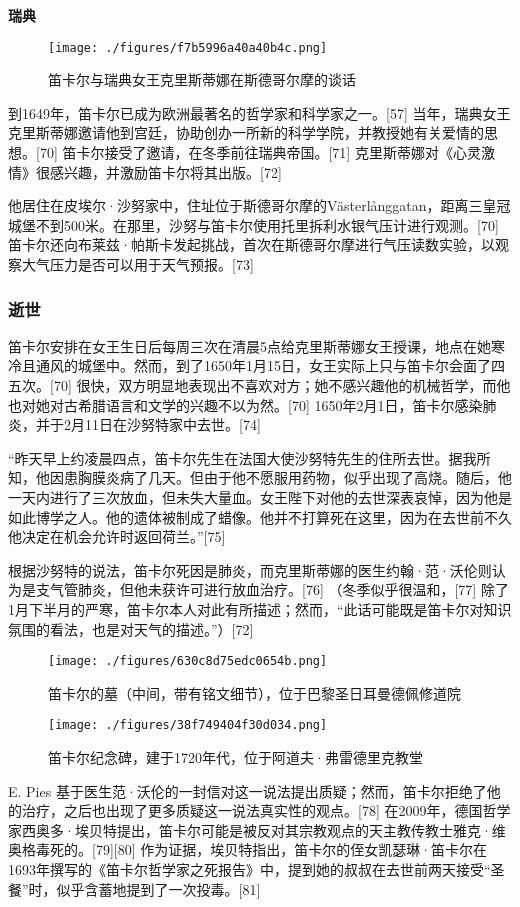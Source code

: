 \textbf{瑞典}
\begin{figure}[ht]
\centering
\texttt{[image: ./figures/f7b5996a40a40b4c.png]}
\caption{笛卡尔与瑞典女王克里斯蒂娜在斯德哥尔摩的谈话} \label{fig_DKE_6}
\end{figure}
到1649年，笛卡尔已成为欧洲最著名的哲学家和科学家之一。[57] 当年，瑞典女王克里斯蒂娜邀请他到宫廷，协助创办一所新的科学学院，并教授她有关爱情的思想。[70] 笛卡尔接受了邀请，在冬季前往瑞典帝国。[71] 克里斯蒂娜对《心灵激情》很感兴趣，并激励笛卡尔将其出版。[72]

他居住在皮埃尔·沙努家中，住址位于斯德哥尔摩的Västerlånggatan，距离三皇冠城堡不到500米。在那里，沙努与笛卡尔使用托里拆利水银气压计进行观测。[70] 笛卡尔还向布莱兹·帕斯卡发起挑战，首次在斯德哥尔摩进行气压读数实验，以观察大气压力是否可以用于天气预报。[73]
\subsubsection{逝世}
笛卡尔安排在女王生日后每周三次在清晨5点给克里斯蒂娜女王授课，地点在她寒冷且通风的城堡中。然而，到了1650年1月15日，女王实际上只与笛卡尔会面了四五次。[70] 很快，双方明显地表现出不喜欢对方；她不感兴趣他的机械哲学，而他也对她对古希腊语言和文学的兴趣不以为然。[70] 1650年2月1日，笛卡尔感染肺炎，并于2月11日在沙努特家中去世。[74]

“昨天早上约凌晨四点，笛卡尔先生在法国大使沙努特先生的住所去世。据我所知，他因患胸膜炎病了几天。但由于他不愿服用药物，似乎出现了高烧。随后，他一天内进行了三次放血，但未失大量血。女王陛下对他的去世深表哀悼，因为他是如此博学之人。他的遗体被制成了蜡像。他并不打算死在这里，因为在去世前不久他决定在机会允许时返回荷兰。”[75]

根据沙努特的说法，笛卡尔死因是肺炎，而克里斯蒂娜的医生约翰·范·沃伦则认为是支气管肺炎，但他未获许可进行放血治疗。[76] （冬季似乎很温和，[77] 除了1月下半月的严寒，笛卡尔本人对此有所描述；然而，“此话可能既是笛卡尔对知识氛围的看法，也是对天气的描述。”）[72]
\begin{figure}[ht]
\centering
\texttt{[image: ./figures/630c8d75edc0654b.png]}
\caption{笛卡尔的墓（中间，带有铭文细节），位于巴黎圣日耳曼德佩修道院} \label{fig_DKE_7}
\end{figure}
\begin{figure}[ht]
\centering
\texttt{[image: ./figures/38f749404f30d034.png]}
\caption{笛卡尔纪念碑，建于1720年代，位于阿道夫·弗雷德里克教堂} \label{fig_DKE_8}
\end{figure}
E. Pies 基于医生范·沃伦的一封信对这一说法提出质疑；然而，笛卡尔拒绝了他的治疗，之后也出现了更多质疑这一说法真实性的观点。[78] 在2009年，德国哲学家西奥多·埃贝特提出，笛卡尔可能是被反对其宗教观点的天主教传教士雅克·维奥格毒死的。[79][80] 作为证据，埃贝特指出，笛卡尔的侄女凯瑟琳·笛卡尔在1693年撰写的《笛卡尔哲学家之死报告》中，提到她的叔叔在去世前两天接受“圣餐”时，似乎含蓄地提到了一次投毒。[81]

